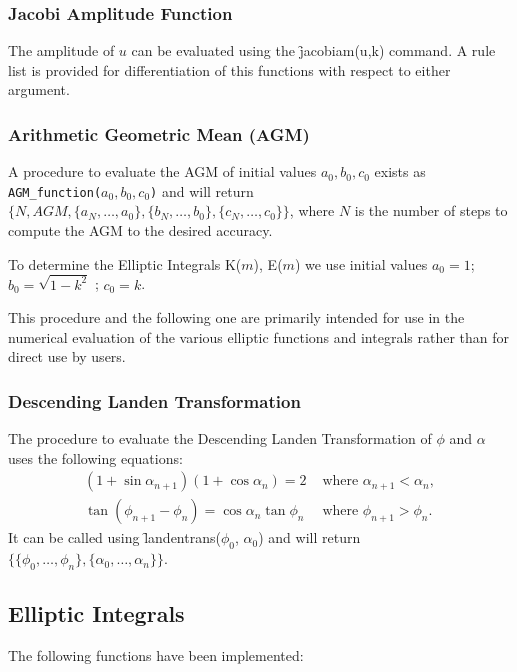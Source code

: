 \subsubsection{Jacobi Amplitude Function}
\hypertarget{operator:JACOBIAM}{}
The amplitude of $u$ can be evaluated using the \f{jacobiam(u,k)}
command.  A rule list is provided for differentiation of this
functions with respect to either argument.

\subsubsection{Arithmetic Geometric Mean (AGM)}
A procedure to evaluate the AGM of initial values \(a_0,b_0,c_0\)
exists as \\
\texttt{AGM\_function(\(a_0,b_0,c_0\))} and will return \\
$\{ N, AGM, \{ a_N, \ldots ,a_0\}, \{ b_N, \ldots ,b_0\},
\{c_N, \ldots ,c_0\}\}$,
where $N$ is the number of steps to compute the AGM to the
desired accuracy.

To determine the Elliptic Integrals K($m$), E($m$) we use initial values
\(a_0 = 1\); \(b_0 = \sqrt{1-k^2}\) ; \(c_0 = k\).

This procedure and the following one are primarily intended for use in the
numerical evaluation of the various elliptic functions and integrals rather
than for direct use by users.

\subsubsection{Descending Landen Transformation}
The procedure to evaluate the Descending Landen Transformation of
$\phi$ and $\alpha$ uses the following equations:
\begin{align*}
 (1+\sin \alpha_{n+1})(1+\cos \alpha_n)=2 &\text{ where } \alpha_{n+1}<\alpha_n, \\
  \tan(\phi_{n+1}-\phi_n)=\cos \alpha_n \tan \phi_n & \text{ where } \phi_{n+1}>\phi_n.
\end{align*}
It can be called using \f{landentrans}($\phi_0$, $\alpha_0$)
and will return \\
$\{\{\phi_0, \ldots ,\phi_n\},\{\alpha_0, \ldots ,\alpha_n\}\}$.

\subsection{Elliptic Integrals}
\hypertarget{ELLIPI}{}
The following functions have been implemented:

